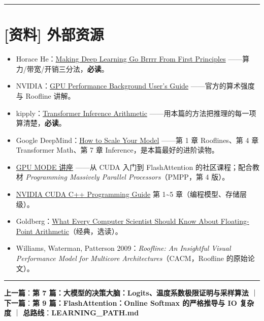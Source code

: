 \vspace{0.8em}\hrule\vspace{0.8em}

\section{[资料] 外部资源}

\begin{itemize}
  \item Horace He：\href{https://horace.io/brrr\_intro.html}{Making Deep Learning Go Brrrr From First Principles} ——算力/带宽/开销三分法，\textbf{必读}。
  \item NVIDIA：\href{https://docs.nvidia.com/deeplearning/performance/dl-performance-gpu-background/index.html}{GPU Performance Background User's Guide} ——官方的算术强度与 Roofline 讲解。
  \item kipply：\href{https://kipp.ly/transformer-inference-arithmetic/}{Transformer Inference Arithmetic} ——用本篇的方法把推理的每一项算清楚，\textbf{必读}。
  \item Google DeepMind：\href{https://jax-ml.github.io/scaling-book/}{How to Scale Your Model} ——第 1 章 Rooflines、第 4 章 Transformer Math、第 7 章 Inference，是本篇最好的进阶读物。
  \item {}\href{https://github.com/gpu-mode/lectures}{GPU MODE 讲座} ——从 CUDA 入门到 FlashAttention 的社区课程；配合教材 \textit{Programming Massively Parallel Processors}（PMPP，第 4 版）。
  \item {}\href{https://docs.nvidia.com/cuda/cuda-c-programming-guide/}{NVIDIA CUDA C++ Programming Guide} 第 1\textasciitilde{}5 章（编程模型、存储层级）。
  \item Goldberg：\href{https://docs.oracle.com/cd/E19957-01/806-3568/ncg\_goldberg.html}{What Every Computer Scientist Should Know About Floating-Point Arithmetic}（经典，选读）。
  \item Williams, Waterman, Patterson 2009：\textit{Roofline: An Insightful Visual Performance Model for Multicore Architectures}（CACM，Roofline 的原始论文）。
\end{itemize}

\vspace{0.8em}\hrule\vspace{0.8em}

\textbf{上一篇}：\textbf{第 7 篇：大模型的决策大脑：Logits、温度系数极限证明与采样算法} ｜ \textbf{下一篇}：\textbf{第 9 篇：FlashAttention：Online Softmax 的严格推导与 IO 复杂度} ｜ \textbf{总路线}：\textbf{LEARNING\_PATH.md}
